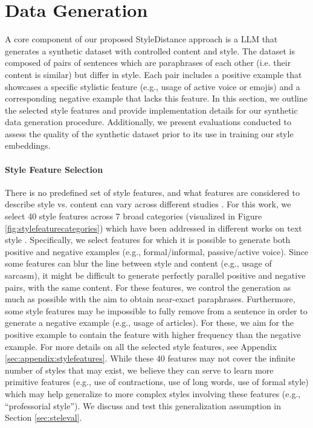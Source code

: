 \section{Data Generation}
\label{sec:datageneration}

A core component of our proposed {\sc StyleDistance} approach is a LLM that generates a synthetic dataset with controlled content and style. The dataset is composed of pairs of sentences which are paraphrases of each other (i.e. their content is similar) but differ in style. Each pair includes a positive example that showcases a specific stylistic feature (e.g., usage of active voice or emojis) and a corresponding negative example that lacks this feature. In this section, we outline the selected style features and provide implementation details for our synthetic data generation procedure. Additionally, we present evaluations conducted to assess the quality of the synthetic dataset prior to its use in training our style embeddings.

\paragraph{Style Feature Selection} There is no predefined set of style features, and what features are considered to describe style vs. content can vary across different studies \citep{tstsurvey}. For this work, we select 40 style features across 7 broad categories (visualized in Figure \ref{fig:stylefeaturecategories}) which have been addressed in different  works on text style \citep{liwc,hovy,stel,tstsurvey,lisa}. Specifically, we select features for which it is possible to generate both positive and negative examples (e.g., formal/informal, passive/active voice). Since some  features can blur the line between style and content (e.g., usage of sarcasm), it might be difficult to generate perfectly parallel positive and negative pairs, with the same content. For these features, we control the  generation as much as possible with the aim to obtain near-exact paraphrases. Furthermore, some style features may be impossible to fully remove from a sentence in order to generate a negative example (e.g., usage of articles). For these, we aim for the positive example to contain the feature with higher frequency than the negative example. For more details on all the selected style features, see Appendix \ref{sec:appendix:stylefeatures}. While these 40 features may not cover the infinite number of styles that may exist, we believe they can serve to learn more primitive features (e.g., use of contractions, use of long words, use of formal style) which may help generalize to more complex styles  involving these features (e.g., ``professorial style''). We discuss and test this generalization assumption in Section \ref{sec:steleval}.

